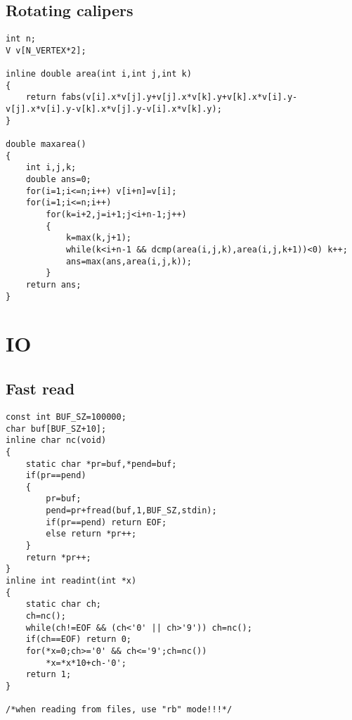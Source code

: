 \documentclass[a4paper,12pt]{article}
\begin{document}
\subsection{Rotating calipers}
\begin{lstlisting}
int n;
V v[N_VERTEX*2];

inline double area(int i,int j,int k)
{
    return fabs(v[i].x*v[j].y+v[j].x*v[k].y+v[k].x*v[i].y-v[j].x*v[i].y-v[k].x*v[j].y-v[i].x*v[k].y);
}

double maxarea()
{
    int i,j,k;
    double ans=0;
    for(i=1;i<=n;i++) v[i+n]=v[i];
    for(i=1;i<=n;i++)
        for(k=i+2,j=i+1;j<i+n-1;j++)
        {
            k=max(k,j+1);
            while(k<i+n-1 && dcmp(area(i,j,k),area(i,j,k+1))<0) k++;
            ans=max(ans,area(i,j,k));
        }
    return ans;
}
\end{lstlisting}


\section{IO}
\subsection{Fast read}
\begin{lstlisting}
const int BUF_SZ=100000;
char buf[BUF_SZ+10];
inline char nc(void)
{
    static char *pr=buf,*pend=buf;
    if(pr==pend)
    {
        pr=buf;
        pend=pr+fread(buf,1,BUF_SZ,stdin);
        if(pr==pend) return EOF;
        else return *pr++;
    }
    return *pr++;
}
inline int readint(int *x)
{
    static char ch;
    ch=nc();
    while(ch!=EOF && (ch<'0' || ch>'9')) ch=nc();
    if(ch==EOF) return 0;
    for(*x=0;ch>='0' && ch<='9';ch=nc())
        *x=*x*10+ch-'0';
    return 1;
}

/*when reading from files, use "rb" mode!!!*/
\end{lstlisting}
\end{document}
